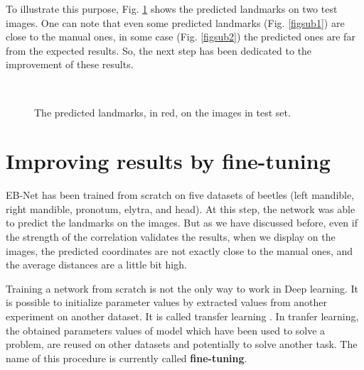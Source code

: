 \documentclass[review]{elsarticle}
\begin{document}
To illustrate this purpose, Fig. \ref{figrsexample} shows the predicted landmarks on two test images. One can note that even some predicted landmarks (Fig. \ref{figsub1}) are close to the manual ones, in some case (Fig. \ref{figsub2}) the predicted ones are far from the expected results. So, the next step has been dedicated to the improvement of these results.
\begin{figure}[htbp]
    \centering
    ~~
\\    
    \caption{The predicted landmarks, in red,  on the images in test set.}
    \label{figrsexample}
\end{figure}
\section{Improving results by fine-tuning}
\label{sfineTuning}
EB-Net has been trained from scratch on five datasets of beetles (left mandible, right mandible, pronotum, elytra, and head). At this step, the network was able to predict the landmarks on the images. But as we have discussed before, even if the strength of the correlation validates the results, when we display on the images, the predicted coordinates are not exactly close to the manual ones, and the average distances are a little bit high.

Training a network from scratch is not the only way to work in Deep learning. It is possible to initialize parameter values by extracted values from another experiment on another dataset. It is called transfer learning \cite{torrey2009transfer}. In tranfer learning, the obtained parameters values of model which have been used to solve a problem, are reused on other datasets \cite{margeta_mri} and potentially to solve another task. The name of this procedure is currently called \textbf{fine-tuning}.
\end{document}
